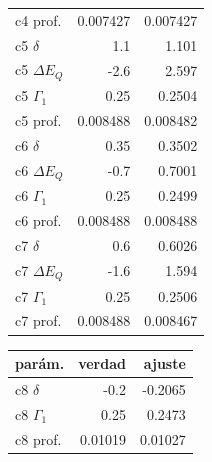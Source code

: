 {\begin{tabular}[t]{@{}lrr@{}}
c4 prof. & 0.007427 & 0.007427\\
c5 $\delta$ & 1.1 & 1.101\\
c5 $\Delta E_Q$ & -2.6 & 2.597\\
c5 $\Gamma_1$ & 0.25 & 0.2504\\
c5 prof. & 0.008488 & 0.008482\\
c6 $\delta$ & 0.35 & 0.3502\\
c6 $\Delta E_Q$ & -0.7 & 0.7001\\
c6 $\Gamma_1$ & 0.25 & 0.2499\\
c6 prof. & 0.008488 & 0.008488\\
c7 $\delta$ & 0.6 & 0.6026\\
c7 $\Delta E_Q$ & -1.6 & 1.594\\
c7 $\Gamma_1$ & 0.25 & 0.2506\\
c7 prof. & 0.008488 & 0.008467\\
\bottomrule
\end{tabular}\hspace{6pt}\begin{tabular}[t]{@{}lrr@{}}
\toprule
par\'am. & verdad & ajuste\\
\midrule
c8 $\delta$ & -0.2 & -0.2065\\
c8 $\Gamma_1$ & 0.25 & 0.2473\\
c8 prof. & 0.01019 & 0.01027\\
\bottomrule
\end{tabular}}\par\vspace{8pt}


